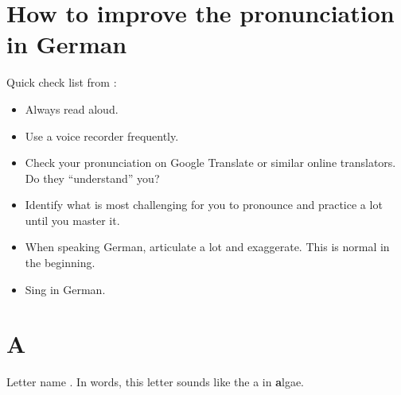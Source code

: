 \section*{How to improve the pronunciation in German}

Quick check list from \cite{raville2025}:
\begin{itemize}
    \item Always read aloud.
    \item Use a voice recorder frequently.
    \item Check your pronunciation on Google Translate or similar online translators. Do they ``understand'' you?
    \item Identify what is most challenging for you to pronounce and practice a lot until you master it.
    \item When speaking German, articulate a lot and exaggerate. This is normal in the beginning.
    \item Sing in German.
\end{itemize}

\section*{A}

Letter name \textipa{[a]}. In words, this letter sounds like the a in \textbf{a}lgae.